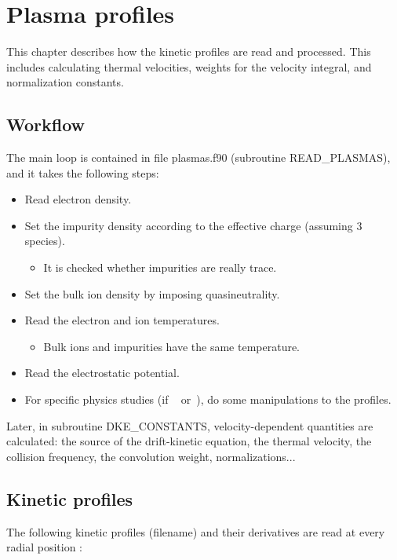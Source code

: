 \chapter{Plasma profiles}\label{CHAP_PROF}

This chapter describes how the kinetic profiles are read and processed. This includes calculating thermal velocities, weights for the velocity integral, and normalization constants.

\section{Workflow}

The main loop is contained in file {\ttfamily plasmas.f90} (subroutine {\ttfamily READ\_PLASMAS}), and it takes the following steps:

\begin{itemize}
\item Read electron density.
\item Set the impurity density according to the effective charge (assuming 3 species).
\begin{itemize}
\item It is checked whether impurities are really trace.
\end{itemize}
\item Set the bulk ion density by imposing quasineutrality.
\item Read the electron and ion temperatures.
\begin{itemize}
\item Bulk ions and impurities have the same temperature.
\end{itemize}
\item Read the electrostatic potential.
\item For specific physics studies (if ~ or~), do some manipulations to the profiles.
\end{itemize}

Later, in subroutine {\ttfamily DKE\_CONSTANTS}, velocity-dependent quantities are calculated: the source of the drift-kinetic equation, the thermal velocity, the collision frequency, the convolution weight, normalizations...


\section{Kinetic profiles}\label{SEC_FILES}

The following kinetic profiles ({\ttfamily filename}) and their derivatives are read at every radial position :


